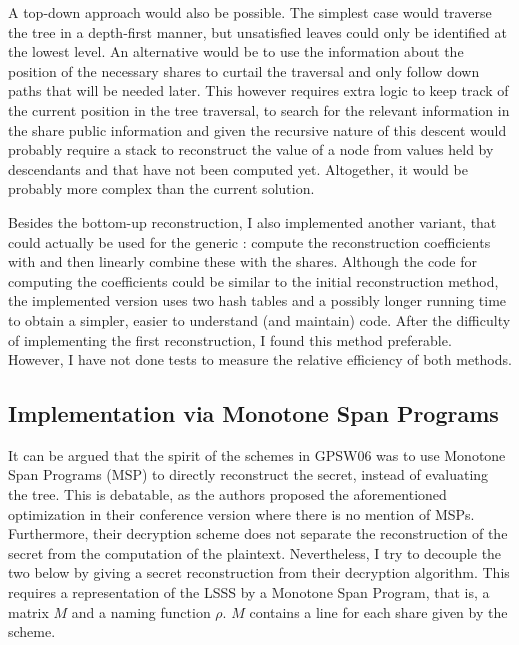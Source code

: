 \documentclass{article}
\begin{document}
A top-down approach would also be possible. The simplest case would traverse the tree in a depth-first manner, but unsatisfied leaves could only be identified at the lowest level. An alternative would be to use the information about the position of the necessary shares to curtail the traversal and only follow down paths that will be needed later. This however requires extra logic to keep track of the current position in the tree traversal, to search for the relevant information in the share public information and given the recursive nature of this descent would probably require a stack to reconstruct the value of a node from values held by descendants and that have not been computed yet. Altogether, it would be probably more complex than the current solution.

Besides the bottom-up reconstruction, I also implemented another variant, that could actually be used for the generic \cSS: compute the reconstruction coefficients with  and then linearly combine these with the shares. Although the code for computing the coefficients could be similar to the initial reconstruction method, the implemented version uses two hash tables and a possibly longer running time to obtain a simpler, easier to understand (and maintain) code. After the difficulty of implementing the first reconstruction, I found this method preferable. However, I have not done tests to measure the relative efficiency of both methods. 

\subsection{Implementation via Monotone Span Programs}

It can be argued that the spirit of the schemes in GPSW06 was to use Monotone Span Programs (MSP) to directly reconstruct the secret, instead of evaluating the tree. This is debatable, as the authors proposed the aforementioned optimization in their conference version where there is no mention of MSPs. Furthermore, their decryption scheme does not separate the reconstruction of the secret from the computation of the plaintext. Nevertheless, I try to decouple the two below by giving a secret reconstruction from their decryption algorithm. This requires a representation of the LSSS by a  Monotone Span Program, that is, a matrix $M$ and a naming function $\rho$. $M$ contains a line for each share given by the scheme. 
\end{document}

